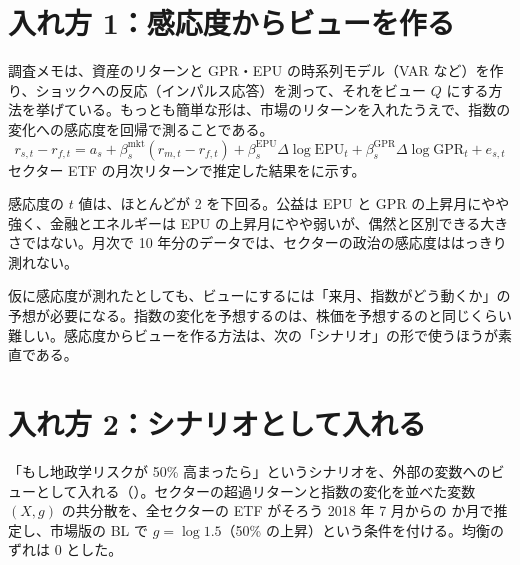\section{入れ方 1：感応度からビューを作る}

調査メモは、資産のリターンと GPR・EPU の時系列モデル（VAR など）を作り、ショックへの反応（インパルス応答）を測って、それをビュー $Q$ にする方法を挙げている。もっとも簡単な形は、市場のリターンを入れたうえで、指数の変化への感応度を回帰で測ることである。
\begin{equation}
r_{s,t}-r_{f,t}=a_s+\beta_{s}^{\mathrm{mkt}}(r_{m,t}-r_{f,t})+\beta_s^{\mathrm{EPU}}\Delta\log\mathrm{EPU}_t+\beta_s^{\mathrm{GPR}}\Delta\log\mathrm{GPR}_t+e_{s,t}
\end{equation}
セクター ETF の月次リターンで推定した結果をに示す。

\begin{table}[htbp]
\centering
\caption{セクター ETF の月次超過リターンの、EPU・GPR の変化への感応度（2015〜2026 年）。「+10\%」の列は、指数が 10\% 上がった月のリターンの違い（\%）。$t$ 値は White の標準誤差による。}
\label{tab:unc-sector}
\end{table}

感応度の $t$ 値は、ほとんどが 2 を下回る。公益は EPU と GPR の上昇月にやや強く、金融とエネルギーは EPU の上昇月にやや弱いが、偶然と区別できる大きさではない。月次で 10 年分のデータでは、セクターの政治の感応度ははっきり測れない。

仮に感応度が測れたとしても、ビューにするには「来月、指数がどう動くか」の予想が必要になる。指数の変化を予想するのは、株価を予想するのと同じくらい難しい。感応度からビューを作る方法は、次の「シナリオ」の形で使うほうが素直である。

\section{入れ方 2：シナリオとして入れる}

「もし地政学リスクが 50\% 高まったら」というシナリオを、外部の変数へのビューとして入れる（）。セクターの超過リターンと指数の変化を並べた変数 $(X,g)$ の共分散を、全セクターの ETF がそろう 2018 年 7 月からの  か月で推定し、市場版の BL で $g=\log1.5$（50\% の上昇）という条件を付ける。均衡のずれは 0 とした。

\begin{table}[htbp]
\centering
\caption{指数の 50\% 上昇を外部の変数へのビューとして入れたときの、セクターの期待リターンの変化（月次 \%）。「確実」は $\Omega\to0$（シナリオ分析）、「$c=1$」は $\Omega$ を指数の変化の分散と同じにしたもの。指数の月次の変化の標準偏差は、GPR が \%、EPU が \%。}
\label{tab:unc-scen}
\end{table}

